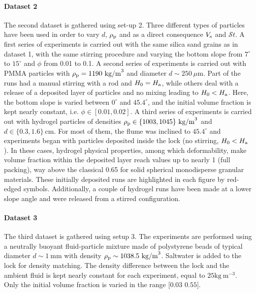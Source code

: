 \documentclass[12pt]{article}
\begin{document}
\paragraph{Dataset 2}

The second dataset is gathered using set-up 2. Three different types of particles have been used in order to vary $d$, $\rho_{\text p}$ and as a direct consequence $V_{\text s}$ and $\mathcal{S}t$. A first series of experiments is carried out with the same silica sand grains as in dataset 1, with the same stirring procedure and varying the bottom slope from $7^\circ$ to $15^\circ$ and $\phi$ from 0.01 to 0.1.
%
A second series of experiments is carried out with PMMA particles with $\rho_{\text p}=1190~\textrm{kg/m}^{3}$ and diameter $d\sim 250~\mu\textrm{m}$. Part of the runs had a manual stirring with a rod and $H_0=H_{\text a}$, while others deal with a release of a deposited layer of particles and no mixing leading to $H_0<H_{\text a}$. Here, the bottom slope is varied between $0^\circ$ and $45.4^\circ$, and the initial volume fraction is kept nearly constant, i.e. $\phi \in [0.01, 0.02]$.
%
A third series of experiments is carried out with hydrogel particles of densities $\rho_{\text p}\in \{1003, 1045\}~\textrm{kg/m}^{3}$ and $d\in \{0.3, 1.6\}~\textrm{cm}$. For most of them, the flume was inclined to $45.4^\circ$ and experiments began with particles deposited inside the lock (no stirring, $H_0<H_{\text a}$). In these cases, hydrogel physical properties, among which deformability, make volume fraction within the deposited layer reach values up to nearly 1 (full packing), way above the classical 0.65 for solid spherical monodisperse granular materials. These initially deposited runs are highlighted in each figure by red-edged symbols. Additionally, a couple of hydrogel runs have been made at a lower slope angle and were released from a stirred configuration.

\paragraph{Dataset 3}

The third dataset is gathered using setup 3. The experiments are performed using a neutrally buoyant fluid-particle mixture made of polystyrene beads of typical diameter $d \sim 1~\textrm{mm}$ with density $\rho_{\text p} \sim 1038.5~\textrm{kg/m}^{3}$. Saltwater is added to the lock for density matching. The density difference between the lock and the ambient fluid is kept nearly constant for each experiment, equal to $25 \textrm{kg}~\textrm{m}^{-3}$. Only the initial volume fraction is varied in the range $[0.03$  $0.55]$.
\end{document}
